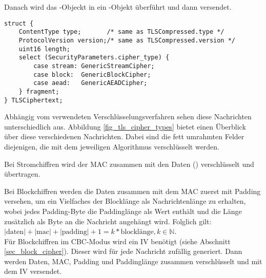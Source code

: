Danach wird das -Objeckt in ein -Objekt überführt und dann versendet.

\begin{lstlisting}
struct {
	ContentType type;       /* same as TLSCompressed.type */
	ProtocolVersion version;/* same as TLSCompressed.version */
	uint16 length;
	select (SecurityParameters.cipher_type) {
	    case stream: GenericStreamCipher;
	    case block:  GenericBlockCipher;
	    case aead:   GenericAEADCipher;
	} fragment;
} TLSCiphertext;
\end{lstlisting}

Abhängig vom verwendeten Verschlüsselungsverfahren sehen diese Nachrichten unterschiedlich aus. Abbildung \ref{fig_tls_cipher_types} bietet einen Überblick über diese verschiedenen Nachrichten. Dabei sind die fett umrahmten Felder diejenigen, die mit dem jeweiligen Algorithmus verschlüsselt werden.

Bei Stromchiffren wird der MAC zusammen mit den Daten () verschlüsselt und übertragen. 

Bei Blockchiffren werden die Daten zusammen mit dem MAC zuerst mit Padding versehen, um ein Vielfaches der Blocklänge als Nachrichtenlänge zu erhalten, wobei jedes Padding-Byte die Paddinglänge als Wert enthält und die Länge zusätzlich als Byte an die Nachricht angehängt wird. Folglich gilt:
\( |\text{daten}| + |\text{mac}| + |\text{padding}| + 1 = k * \text{blocklänge}, k \in \mathbb{N}\).\\
Für Blockchiffren im CBC-Modus wird ein IV benötigt (siehe Abschnitt \ref{sec_block_cipher}). Dieser wird für jede Nachricht zufällig generiert. Dann werden Daten, MAC, Padding und Paddinglänge zusammen verschlüsselt und mit dem IV versendet.


